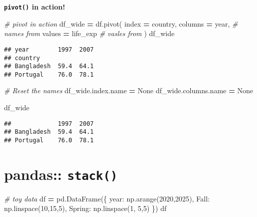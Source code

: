\documentclass[
]{book}
\newenvironment{Shaded}{\begin{snugshade}}{\end{snugshade}}
\newcommand{\CommentTok}[1]{\textcolor[rgb]{0.56,0.35,0.01}{\textit{#1}}}
\newcommand{\DecValTok}[1]{\textcolor[rgb]{0.00,0.00,0.81}{#1}}
\newcommand{\NormalTok}[1]{#1}
\newcommand{\OperatorTok}[1]{\textcolor[rgb]{0.81,0.36,0.00}{\textbf{#1}}}
\newcommand{\StringTok}[1]{\textcolor[rgb]{0.31,0.60,0.02}{#1}}
\newcommand{\VariableTok}[1]{\textcolor[rgb]{0.00,0.00,0.00}{#1}}
\begin{document}
{\textbf{\texttt{pivot()} in action!}}

\begin{Shaded}
\begin{Highlighting}[]
\CommentTok{\# pivot in action}
\NormalTok{df\_wide }\OperatorTok{=}\NormalTok{ df.pivot(}
\NormalTok{    index }\OperatorTok{=} \StringTok{\textquotesingle{}country\textquotesingle{}}\NormalTok{,}
\NormalTok{    columns }\OperatorTok{=} \StringTok{\textquotesingle{}year\textquotesingle{}}\NormalTok{, }\CommentTok{\# names from}
\NormalTok{    values }\OperatorTok{=} \StringTok{\textquotesingle{}life\_exp\textquotesingle{}} \CommentTok{\# vasles from}
\NormalTok{)}
\NormalTok{df\_wide}
\end{Highlighting}
\end{Shaded}

\begin{verbatim}
## year        1997  2007
## country               
## Bangladesh  59.4  64.1
## Portugal    76.0  78.1
\end{verbatim}

\begin{Shaded}
\begin{Highlighting}[]
\CommentTok{\# Reset the names}
\NormalTok{df\_wide.index.name }\OperatorTok{=} \VariableTok{None}
\NormalTok{df\_wide.columns.name }\OperatorTok{=} \VariableTok{None}
\end{Highlighting}
\end{Shaded}

\begin{Shaded}
\begin{Highlighting}[]
\NormalTok{df\_wide}
\end{Highlighting}
\end{Shaded}

\begin{verbatim}
##             1997  2007
## Bangladesh  59.4  64.1
## Portugal    76.0  78.1
\end{verbatim}

\hypertarget{pandas-stack}{%
\section{\texorpdfstring{pandas:: \texttt{stack()}}{pandas:: stack()}}\label{pandas-stack}}

\begin{Shaded}
\begin{Highlighting}[]
\CommentTok{\# toy data}
\NormalTok{df }\OperatorTok{=}\NormalTok{ pd.DataFrame(\{}
    \StringTok{\textquotesingle{}year\textquotesingle{}}\NormalTok{: np.arange(}\DecValTok{2020}\NormalTok{,}\DecValTok{2025}\NormalTok{),}
    \StringTok{\textquotesingle{}Fall\textquotesingle{}}\NormalTok{: np.linspace(}\DecValTok{10}\NormalTok{,}\DecValTok{15}\NormalTok{,}\DecValTok{5}\NormalTok{),}
    \StringTok{\textquotesingle{}Spring\textquotesingle{}}\NormalTok{: np.linspace(}\DecValTok{1}\NormalTok{, }\DecValTok{5}\NormalTok{,}\DecValTok{5}\NormalTok{)}
\NormalTok{\})}
\NormalTok{df}
\end{Highlighting}
\end{Shaded}
\end{document}
